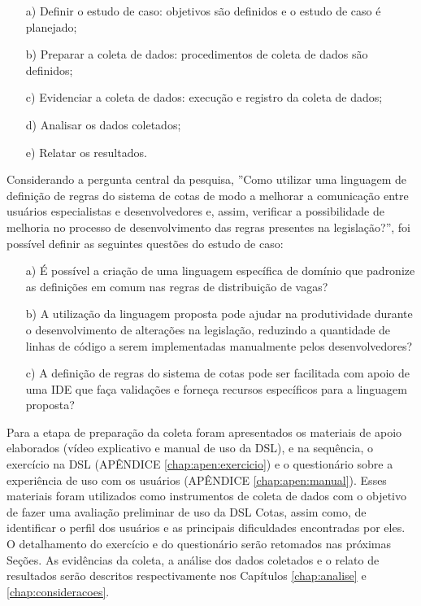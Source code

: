     \begin{itemize}
        \item[a)] Definir o estudo de caso: objetivos são definidos e o estudo de caso é planejado;
        \item[b)] Preparar a coleta de dados: procedimentos de coleta de dados são definidos;
        \item[c)] Evidenciar a coleta de dados: execução e registro da coleta de dados;
        \item[d)] Analisar os dados coletados;
        \item[e)] Relatar os resultados.
    \end{itemize}

    Considerando a pergunta central da pesquisa, ''Como utilizar uma linguagem de definição de regras do sistema de cotas de modo a melhorar a comunicação entre usuários especialistas e desenvolvedores e, assim, verificar a possibilidade de melhoria no processo de desenvolvimento das regras presentes na legislação?'', foi possível definir as seguintes questões do estudo de caso:
    
    \begin{enumerate}
        \item[a)] É possível a criação de uma linguagem específica de domínio que padronize as definições em comum nas regras de distribuição de vagas?
        
        \item[b)] A utilização da linguagem proposta pode ajudar na produtividade durante o desenvolvimento de alterações na legislação, reduzindo a quantidade de linhas de código a serem implementadas manualmente pelos desenvolvedores?
        
        \item[c)] A definição de regras do sistema de cotas pode ser facilitada com apoio de uma \gls{IDE} que faça validações e forneça recursos específicos para a linguagem proposta?
    \end{enumerate}
    
  
    Para a etapa de preparação da coleta foram apresentados os materiais de apoio elaborados (vídeo explicativo e manual de uso da DSL), e na sequência, o exercício na DSL (APÊNDICE \ref{chap:apen:exercicio}) e o questionário sobre a experiência de uso com os usuários (APÊNDICE \ref{chap:apen:manual}). Esses materiais foram utilizados como instrumentos de coleta de dados com o objetivo de fazer uma avaliação preliminar de uso da DSL Cotas, assim como, de identificar o perfil dos usuários e as principais dificuldades encontradas por eles. O detalhamento do exercício e do questionário serão retomados nas próximas Seções. As evidências da coleta, a análise dos dados coletados e o relato de resultados serão descritos respectivamente nos Capítulos \ref{chap:analise} e \ref{chap:consideracoes}.
 
